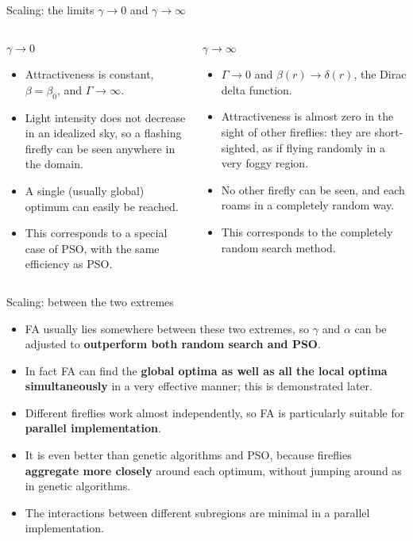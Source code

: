 \documentclass[aspectratio=169,11pt]{beamer}
\begin{document}
\begin{frame}[t]{Scaling: the limits $\gamma\to 0$ and $\gamma\to\infty$}
\small
\begin{columns}[T]
\begin{block}{$\gamma\to 0$}
\begin{itemize}\itemsep0.3em
  \item Attractiveness is constant, $\beta=\beta_0$, and $\Gamma\to\infty$.
  \item Light intensity does not decrease in an idealized sky, so a flashing firefly can be seen anywhere in the domain.
  \item A single (usually global) optimum can easily be reached.
  \item This corresponds to a special case of PSO, with the same efficiency as PSO.
\end{itemize}
\end{block}
\begin{block}{$\gamma\to\infty$}
\begin{itemize}\itemsep0.3em
  \item $\Gamma\to 0$ and $\beta(r)\to\delta(r)$, the Dirac delta function.
  \item Attractiveness is almost zero in the sight of other fireflies: they are short-sighted, as if flying randomly in a very foggy region.
  \item No other firefly can be seen, and each roams in a completely random way.
  \item This corresponds to the completely random search method.
\end{itemize}
\end{block}
\end{columns}
\end{frame}

\begin{frame}[t]{Scaling: between the two extremes}
\begin{itemize}\itemsep0.7em
  \item FA usually lies somewhere between these two extremes, so $\gamma$ and $\alpha$ can be adjusted to \textbf{outperform both random search and PSO}.
  \item In fact FA can find the \textbf{global optima as well as all the local optima simultaneously} in a very effective manner; this is demonstrated later.
  \item Different fireflies work almost independently, so FA is particularly suitable for \textbf{parallel implementation}.
  \item It is even better than genetic algorithms and PSO, because fireflies \textbf{aggregate more closely} around each optimum, without jumping around as in genetic algorithms.
  \item The interactions between different subregions are minimal in a parallel implementation.
\end{itemize}
\end{frame}
\end{document}
